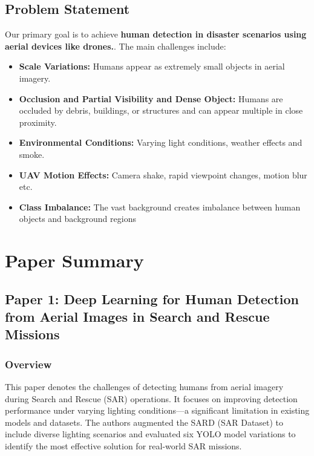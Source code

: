 \documentclass[12pt,a4paper]{report}
\begin{document}
\section{Problem Statement}
Our primary goal is to achieve \textbf{human detection in disaster scenarios using aerial devices like drones.}. The main challenges include:

\begin{itemize}
\item \textbf{Scale Variations:} Humans appear as extremely small objects in aerial imagery.
\item \textbf{Occlusion and Partial Visibility and Dense Object:} Humans are occluded by debris, buildings, or structures and can appear multiple in close proximity.
\item \textbf{Environmental Conditions:} Varying light conditions, weather effects and smoke.
\item \textbf{UAV Motion Effects:} Camera shake, rapid viewpoint changes,  motion blur etc.
\item \textbf{Class Imbalance:} The vast background creates  imbalance between human objects and background regions
\end{itemize}


\chapter{Paper Summary}

\section{Paper 1: Deep Learning for Human Detection from Aerial Images in Search and Rescue Missions}

\subsection{Overview}
This paper denotes  the  challenges of detecting humans from aerial imagery during Search and Rescue (SAR) operations. It focuses on improving detection performance under varying lighting conditions—a significant limitation in existing models and datasets. The authors augmented the SARD (SAR Dataset) to include diverse lighting scenarios and evaluated six YOLO model variations to identify the most effective solution for real-world SAR missions.
\end{document}
